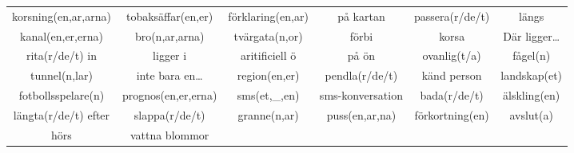 \begin{center}
\begin{adjustwidth}{-2.7cm}{}
\begin{tabular}{|c c c c c c|}
            korsning(en,ar,arna) & tobaksäffar(en,er) & förklaring(en,ar) & på kartan & passera(r/de/t) & längs \\
            kanal(en,er,erna) & bro(n,ar,arna) & tvärgata(n,or) & förbi & korsa & Där ligger\ldots \\
            rita(r/de/t) in & ligger i & aritificiell ö & på ön & ovanlig(t/a) & fågel(n) \\
            tunnel(n,lar) & inte bara en\ldots & region(en,er) & pendla(r/de/t) & känd person & landskap(et) \\
            fotbollsspelare(n) & prognos(en,er,erna) & sms(et,\_,en) & sms-konversation & bada(r/de/t) & älskling(en) \\
            längta(r/de/t) efter & slappa(r/de/t) & granne(n,ar) & puss(en,ar,na) & förkortning(en) & avslut(a) \\
            hörs & vattna blommor &  &  &  &  \\
            \hline
        \end{tabular}
    \end{adjustwidth}
\end{center}

